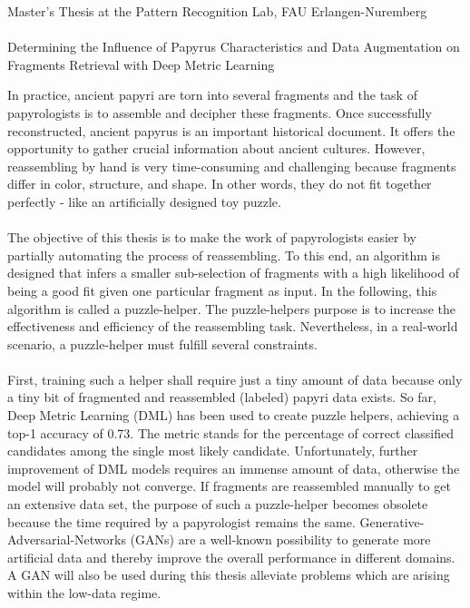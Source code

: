 \documentclass[12pt,a4paper]{article}
\begin{document}
\begin{center}
	Master's Thesis at the Pattern Recognition Lab, FAU Erlangen-Nuremberg \hfill \\[5mm]
																				
	\mbox{}\\
	{\Large Determining the Influence of Papyrus Characteristics and Data Augmentation on Fragments Retrieval with Deep Metric Learning}
			
\end{center}


In practice, ancient papyri are torn into several fragments and the task of papyrologists is to assemble and decipher these fragments. Once successfully reconstructed, ancient papyrus is an important historical document. It offers the opportunity to gather crucial information about ancient cultures.
However, reassembling by hand is very time-consuming and challenging because fragments differ in color, structure, and shape. In other words, they do not fit together perfectly - like an artificially designed toy puzzle. 
\\\\
The objective of this thesis is to make the work of papyrologists easier by partially automating the process of reassembling. To this end, an algorithm is designed that infers a smaller sub-selection of fragments with a high likelihood of being a good fit given one particular fragment as input. 
In the following, this algorithm is called a puzzle-helper. The puzzle-helpers purpose is to increase the effectiveness and efficiency of the reassembling task.  Nevertheless, in a real-world scenario, a puzzle-helper must fulfill several constraints.
\\\\
First, training such a helper shall require just a tiny amount of data because only a tiny bit of fragmented and reassembled (labeled) papyri data exists. So far, Deep Metric Learning (DML) has been used to create puzzle helpers, achieving a top-1 accuracy of 0.73. The metric stands for the percentage of correct classified candidates among the single most likely candidate. Unfortunately, further improvement of DML models requires an immense amount of data, otherwise the model will probably not converge. If fragments are reassembled manually to get an extensive data set, the purpose of such a puzzle-helper becomes obsolete because the time required by a papyrologist remains the same. Generative-Adversarial-Networks (GANs) are a well-known possibility to generate more artificial data and thereby improve the overall performance in different domains. A GAN will also be used during this thesis alleviate problems which are arising within the low-data regime. 
\end{document}
